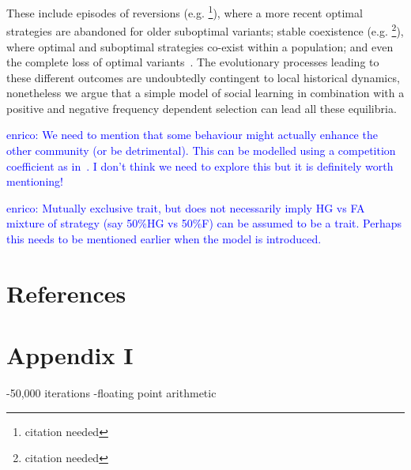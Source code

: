 \documentclass[preprint,authoryear]{elsarticle}
\newcommand{\memo}[2]{\textcolor{#1}{#2}}
\newcommand{\enrico}[1]{\memo{blue}{enrico: #1\\}}
\begin{document}
These include episodes of reversions (e.g. \footnote{citation needed}), where a more recent optimal strategies are abandoned for older suboptimal variants; stable coexistence (e.g. \footnote{citation needed}), where optimal and suboptimal strategies co-exist within a population; and even the complete loss of optimal variants~\citep[e.g.][]{henrich2004}. The evolutionary processes leading to these different outcomes are undoubtedly contingent to local historical dynamics, nonetheless we argue that a simple model of social learning in combination with a positive and negative frequency dependent selection can lead all these equilibria.


\enrico{We need to mention that some behaviour might actually enhance the other community (or be detrimental). This can be modelled using a competition coefficient as in~\citep{jang2013}. I don't think we need to explore this but it is definitely worth mentioning!}

\enrico{Mutually exclusive trait, but does not necessarily imply HG vs FA mixture of strategy (say 50\%HG vs 50\%F) can be assumed to be a trait. Perhaps this needs to be mentioned earlier when the model is introduced.}


\section{References}




\section{Appendix I}

-50,000 iterations
-floating point arithmetic
\end{document}
